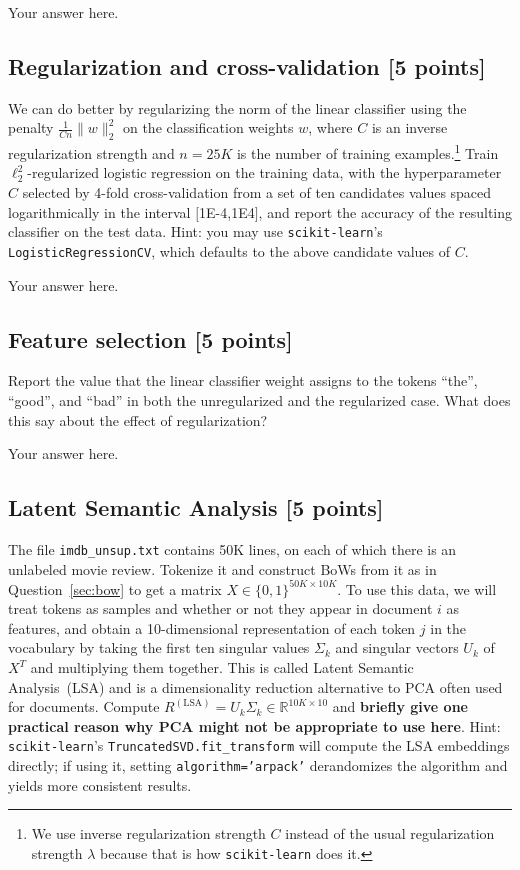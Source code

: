 \documentclass[a4paper]{article}
\theoremstyle{definition}
\begin{document}
{\color{blue}
		Your answer here.
}

\subsection{Regularization and cross-validation [5 points]}

We can do better by regularizing the norm of the linear classifier using the penalty $\tfrac1{Cn}\|w\|_2^2$ on the classification weights $w$, where $C$ is an inverse regularization strength and $n=25K$ is the number of training examples.\footnote{We use inverse regularization strength $C$ instead of the usual regularization strength $\lambda$ because that is how {\tt scikit-learn} does it.}
Train $\ell_2^2$-regularized logistic regression on the training data, with the hyperparameter $C$ selected by 4-fold cross-validation from a set of ten candidates values spaced logarithmically in the interval $[$1E-4,1E4$]$, and report the accuracy of the resulting classifier on the test data.
Hint: you may use {\tt scikit-learn}'s {\tt LogisticRegressionCV}, which defaults to the above candidate values of $C$.

{\color{blue}
		Your answer here.
}

\subsection{Feature selection [5 points]}

Report the value that the linear classifier weight assigns to the tokens ``the'', ``good'', and ``bad'' in both the unregularized and the regularized case.
What does this say about the effect of regularization?

{\color{blue}
		Your answer here.
}

\subsection{Latent Semantic Analysis [5 points]}

The file {\tt imdb\_unsup.txt} contains 50K lines, on each of which there is an unlabeled movie review.
Tokenize it and construct BoWs from it as in Question~\ref{sec:bow} to get a matrix $X\in\{0,1\}^{50K\times10K}$.
To use this data, we will treat tokens as samples and whether or not they appear in document $i$ as features, and obtain a 10-dimensional representation of each token $j$ in the vocabulary by taking the first ten singular values $\Sigma_k$ and singular vectors $U_k$ of $X^T$ and multiplying them together.
This is called Latent Semantic Analysis~(LSA) and is a dimensionality reduction alternative to PCA often used for documents.
Compute $R^{(\textrm{LSA})}=U_k\Sigma_k\in\mathbb{R}^{10K\times 10}$ and {\bf briefly give one practical reason why PCA might not be appropriate to use here}.
Hint: {\tt scikit-learn}'s {\tt TruncatedSVD.fit\_transform} will compute the LSA embeddings directly; if using it, setting {\tt algorithm='arpack'} derandomizes the algorithm and yields more consistent results.
\end{document}

